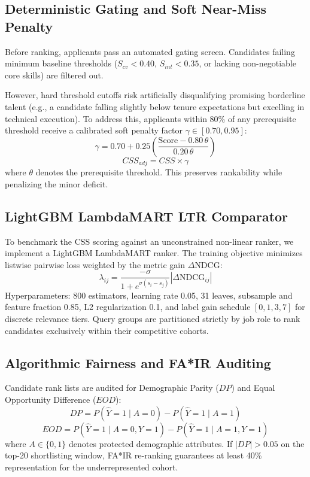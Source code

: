 \documentclass[conference]{IEEEtran}
\begin{document}
\subsection{Deterministic Gating and Soft Near-Miss Penalty}
Before ranking, applicants pass an automated gating screen. Candidates failing minimum baseline thresholds ($S_{cv} < 0.40$, $S_{int} < 0.35$, or lacking non-negotiable core skills) are filtered out.

However, hard threshold cutoffs risk artificially disqualifying promising borderline talent (e.g., a candidate falling slightly below tenure expectations but excelling in technical execution). To address this, applicants within 80\% of any prerequisite threshold receive a calibrated soft penalty factor $\gamma \in [0.70, 0.95]$:
\begin{equation}
\gamma = 0.70 + 0.25 \left(\frac{\text{Score} - 0.80\,\theta}{0.20\,\theta}\right)
\end{equation}
\begin{equation}
CSS_{adj} = CSS \times \gamma
\end{equation}
where $\theta$ denotes the prerequisite threshold. This preserves rankability while penalizing the minor deficit.

\subsection{LightGBM LambdaMART LTR Comparator}
To benchmark the CSS scoring against an unconstrained non-linear ranker, we implement a LightGBM LambdaMART ranker. The training objective minimizes listwise pairwise loss weighted by the metric gain $\Delta\text{NDCG}$:
\begin{equation}
\lambda_{ij} = \frac{-\sigma}{1 + e^{\sigma(s_i - s_j)}} |\Delta\text{NDCG}_{ij}|
\end{equation}
Hyperparameters: 800 estimators, learning rate 0.05, 31 leaves, subsample and feature fraction 0.85, L2 regularization 0.1, and label gain schedule $[0, 1, 3, 7]$ for discrete relevance tiers. Query groups are partitioned strictly by job role to rank candidates exclusively within their competitive cohorts.

\subsection{Algorithmic Fairness and FA*IR Auditing}
Candidate rank lists are audited for Demographic Parity ($DP$) and Equal Opportunity Difference ($EOD$):
\begin{equation}
DP = P(\hat{Y} = 1 \mid A = 0) - P(\hat{Y} = 1 \mid A = 1)
\end{equation}
\begin{equation}
EOD = P(\hat{Y} = 1 \mid A = 0, Y = 1) - P(\hat{Y} = 1 \mid A = 1, Y = 1)
\end{equation}
where $A \in \{0, 1\}$ denotes protected demographic attributes. If $|DP| > 0.05$ on the top-20 shortlisting window, FA*IR re-ranking guarantees at least 40\% representation for the underrepresented cohort.
\end{document}
